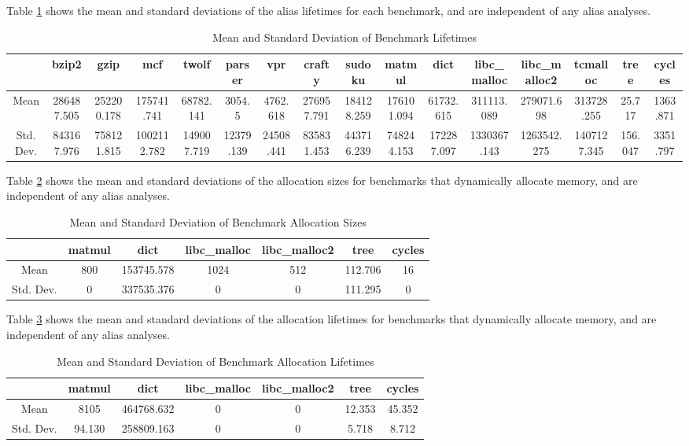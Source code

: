 Table \ref{table:5} shows the mean and standard deviations of the alias lifetimes for each benchmark, and are independent of any alias analyses.

\begin{table}
\centering
   \begin{tabular} {|c|c c c c c c c c c c c c c c c|}
      \hline
      & bzip2 & gzip & mcf & twolf & parser & vpr & crafty & sudoku & matmul & dict & libc_malloc & libc_malloc2 & tcmalloc & tree & cycles \\
      \hline
      Mean & 286487.505 & 252200.178 & 175741.741 & 68782.141 & 3054.5 & 4762.618 & 276957.791 & 184128.259 & 176101.094 & 61732.615 & 311113.089 & 279071.698 & 313728.255 & 25.717 & 1363.871 \\
      \hline
      Std. Dev. & 843167.976 & 758121.815 & 1002112.782 & 149007.719 & 12379.139 & 24508.441 & 835831.453 & 443716.239 & 748244.153 & 172287.097 & 1330367.143 & 1263542.275 & 1407127.345 & 156.047 & 3351.797 \\
      \hline
   \end{tabular}
   \caption{Mean and Standard Deviation of Benchmark Lifetimes}
   \label{table:5}
\end{table}

Table \ref{table:6} shows the mean and standard deviations of the allocation sizes for benchmarks that dynamically allocate memory, and are independent of any alias analyses.

\begin{table}
\centering
   \begin{tabular} {|c|c c c c c c|}
      \hline
      & matmul & dict & libc_malloc & libc_malloc2 & tree & cycles \\
      \hline
      Mean & 800 & 153745.578 & 1024 & 512 & 112.706 & 16 \\
      \hline
      Std. Dev. & 0 & 337535.376 & 0 & 0 & 111.295 & 0 \\
      \hline
   \end{tabular}
   \caption{Mean and Standard Deviation of Benchmark Allocation Sizes}
   \label{table:6}
\end{table}

Table \ref{table:7} shows the mean and standard deviations of the allocation lifetimes for benchmarks that dynamically allocate memory, and are independent of any alias analyses.

\begin{table}
\centering
   \begin{tabular} {|c|c c c c c c|}
      \hline
      & matmul & dict & libc_malloc & libc_malloc2 & tree & cycles \\
      \hline
      Mean & 8105 & 464768.632 & 0 & 0 & 12.353 & 45.352 \\
      \hline
      Std. Dev. & 94.130 & 258809.163 & 0 & 0 & 5.718 & 8.712 \\
      \hline
   \end{tabular}
   \caption{Mean and Standard Deviation of Benchmark Allocation Lifetimes}
   \label{table:7}
\end{table}
